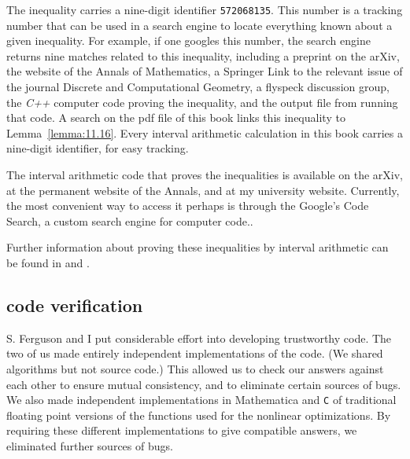 The inequality carries a nine-digit identifier {\tt 572068135}.    This number
is a tracking number that can be used in a search engine to locate everything known
about a given inequality.
For example,
if one googles this number, the search engine returns 
nine matches related to this inequality, including
a preprint on the arXiv, the website of the Annals of Mathematics, a Springer Link
to the relevant issue of the journal Discrete and Computational Geometry, a flyspeck
discussion group, the {\it C++} computer code proving the inequality, and the output
file from running that code.  A search on the pdf file of this book links this inequality to
Lemma~\ref{lemma:11.16}.  Every interval arithmetic calculation in this book carries
a nine-digit identifier, for easy tracking.

The interval arithmetic code that proves the inequalities is available on the arXiv,
at the permanent website of the Annals, and at my university website.  
Currently, the most convenient
way to access it perhaps is through the Google's Code Search, 
a custom search engine for computer code..  


Further information about proving these inequalities by interval arithmetic can
be found in \cite{algorithm} and
\cite{part1}. 

\subsection{code verification}

S. Ferguson and I put considerable effort into developing trustworthy
code.  The two of us made entirely independent implementations of
the code. %
(We shared algorithms
but not source code.)  This allowed us to check our answers against each
other to ensure mutual consistency, 
and to eliminate certain sources of bugs.  We also made independent
implementations in Mathematica and {\tt C} of traditional floating point
versions of the functions used for the nonlinear
optimizations.  By requiring these different implementations to give
compatible answers, we eliminated further sources of bugs.

